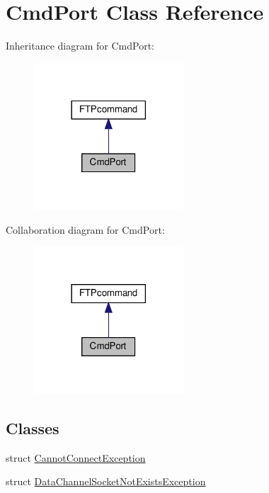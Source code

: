 \hypertarget{classCmdPort}{}\section{Cmd\+Port Class Reference}
\label{classCmdPort}


Inheritance diagram for Cmd\+Port\+:
\nopagebreak
\begin{figure}[H]
\begin{center}
\leavevmode
\includegraphics[width=158pt]{classCmdPort__inherit__graph}
\end{center}
\end{figure}


Collaboration diagram for Cmd\+Port\+:
\nopagebreak
\begin{figure}[H]
\begin{center}
\leavevmode
\includegraphics[width=158pt]{classCmdPort__coll__graph}
\end{center}
\end{figure}
\subsection*{Classes}
\begin{DoxyCompactItemize}
\item 
struct \hyperlink{structCmdPort_1_1CannotConnectException}{Cannot\+Connect\+Exception}
\item 
struct \hyperlink{structCmdPort_1_1DataChannelSocketNotExistsException}{Data\+Channel\+Socket\+Not\+Exists\+Exception}
\end{DoxyCompactItemize}
